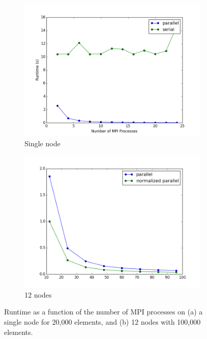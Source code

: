 \documentclass[10pt]{article}
\begin{document}
\begin{figure}[H]
        \centering
        \begin{subfigure}[b]{0.5\textwidth}
                \centering
                \includegraphics[width=\textwidth]{../figures/singlenode-mpi.png}
                \caption{Single node}
        \end{subfigure}%
                \begin{subfigure}[b]{0.5\textwidth}
                \centering
                \includegraphics[width=\textwidth]{../figures/speedup-mpi-multinode.png}
                \caption{12 nodes}
        \end{subfigure}%
\caption{Runtime as a function of the number of MPI processes on (a) a single node for 20,000 elements, and (b) 12 nodes with 100,000 elements.}
        \label{fig:speedupMPIruntime}
\end{figure}
\end{document}
